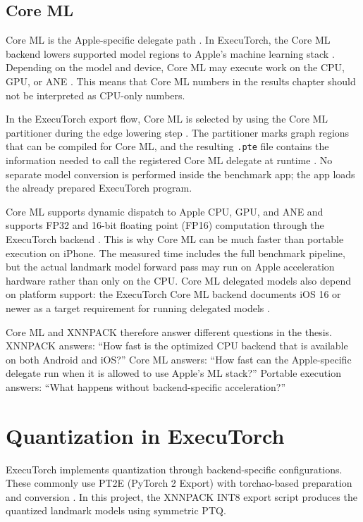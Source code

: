 \subsection{Core ML}

Core ML is the Apple-specific delegate path
\cite{apple_coreml}. In ExecuTorch, the Core ML backend lowers supported model
regions to Apple's machine learning stack \cite{executorch_coreml}. Depending
on the model and device, Core ML may execute work on the CPU,
GPU, or ANE
\cite{apple_coreml}. This means that Core ML numbers in the results chapter
should not be interpreted as CPU-only numbers.

In the ExecuTorch export flow, Core ML is selected by using the Core ML
partitioner during the edge lowering step
\cite{executorch_coreml}. The partitioner marks graph regions that can be
compiled for Core ML, and the resulting \texttt{.pte} file contains the
information needed to call the registered Core ML delegate at runtime
\cite{executorch_coreml,executorch_delegate}. No separate model conversion is
performed inside the benchmark app; the app loads the already prepared
ExecuTorch program.

Core ML supports dynamic dispatch to Apple CPU, GPU, and ANE and supports FP32
and 16-bit floating point (FP16) computation through the ExecuTorch backend
\cite{executorch_coreml}.
This is why Core ML can be much faster than portable execution on iPhone. The
measured time includes the full benchmark pipeline, but the actual landmark
model forward pass may run on Apple acceleration hardware rather than only on
the CPU. Core ML delegated models also depend on platform support: the
ExecuTorch Core ML backend documents iOS 16 or newer as a target requirement
for running delegated models \cite{executorch_coreml}.

Core ML and XNNPACK therefore answer different questions in the thesis. XNNPACK
answers: ``How fast is the optimized CPU backend that is available on both
Android and iOS?'' Core ML answers: ``How fast can the Apple-specific delegate
run when it is allowed to use Apple's ML stack?'' Portable execution answers:
``What happens without backend-specific acceleration?''

\section{Quantization in ExecuTorch}

ExecuTorch implements quantization through backend-specific configurations.
These commonly use PT2E (PyTorch 2 Export) with torchao-based preparation and
conversion \cite{executorch_quantization,torchao_pt2e}. In this project, the
XNNPACK INT8 export script produces the quantized landmark models using
symmetric PTQ.

